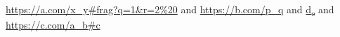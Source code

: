 \documentclass[11pt]{article}
\author{root}
\date{\today}
\title{}
\begin{document}
\tableofcontents

\url{https://a.com/x\_y\#frag?q=1\&r=2\%20} and \url{https://b.com/p\_q} and \href{https://c.com/a\_b\#c}{d\textsubscript{e}} and \url{https://c.com/a\_b\#c}
\end{document}
